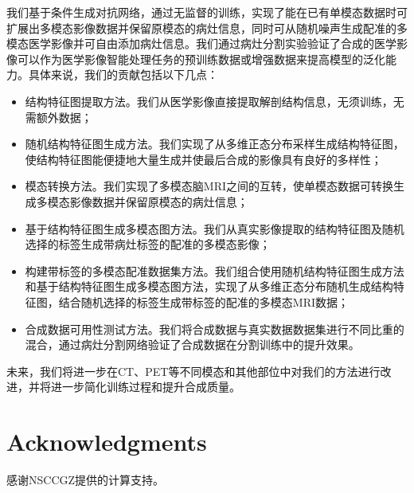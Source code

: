\documentclass[letterpaper]{article} %
\begin{document}
我们基于条件生成对抗网络，通过无监督的训练，实现了能在已有单模态数据时可扩展出多模态影像数据并保留原模态的病灶信息，同时可从随机噪声生成配准的多模态医学影像并可自由添加病灶信息。我们通过病灶分割实验验证了合成的医学影像可以作为医学影像智能处理任务的预训练数据或增强数据来提高模型的泛化能力。具体来说，我们的贡献包括以下几点：
\begin{itemize}
	\item 结构特征图提取方法。我们从医学影像直接提取解剖结构信息，无须训练，无需额外数据；
	\item 随机结构特征图生成方法。我们实现了从多维正态分布采样生成结构特征图，使结构特征图能便捷地大量生成并使最后合成的影像具有良好的多样性；
	\item 模态转换方法。我们实现了多模态脑MRI之间的互转，使单模态数据可转换生成多模态影像数据并保留原模态的病灶信息；
	\item 基于结构特征图生成多模态图方法。我们从真实影像提取的结构特征图及随机选择的标签生成带病灶标签的配准的多模态影像；
	\item 构建带标签的多模态配准数据集方法。我们组合使用随机结构特征图生成方法和基于结构特征图生成多模态图方法，实现了从多维正态分布随机生成结构特征图，结合随机选择的标签生成带标签的配准的多模态MRI数据；
	\item 合成数据可用性测试方法。我们将合成数据与真实数据数据集进行不同比重的混合，通过病灶分割网络验证了合成数据在分割训练中的提升效果。
\end{itemize}

未来，我们将进一步在CT、PET等不同模态和其他部位中对我们的方法进行改进，并将进一步简化训练过程和提升合成质量。	
	

\section{ Acknowledgments}

感谢NSCCGZ提供的计算支持。



\end{document}
